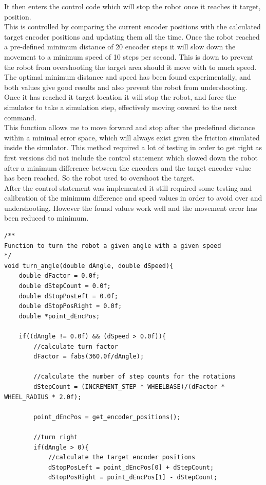 \documentclass[10pt,a4paper]{article}
\begin{document}
\begin{flushleft}
It then enters the control code which will stop the robot once it reaches it target, position. \\
This is controlled by comparing the current encoder positions with the calculated target encoder positions and updating them all the time. 
Once the robot reached a pre-defined minimum distance of 20 encoder steps it will slow down the movement to a minimum speed of 10 steps per second. This is down to prevent the robot from overshooting the target area should it move with to much speed. The optimal minimum distance and speed has been found experimentally, and both values give good results and also prevent the robot from undershooting.
Once it has reached it target location it will stop the robot, and force the simulator to take a simulation step, effectively moving onward to the next command.\\[3ex]

This function allows me to move forward and stop after the predefined distance within a minimal error space, which will always exist given the friction simulated inside the simulator. This method required a lot of testing in order to get right as first versions did not include the control statement which slowed down the robot after a minimum difference between the encoders and the target encoder value has been reached. So the robot used to overshoot the target. \\
After the control statement was implemented it still required some testing and calibration of the minimum difference and speed values in order to avoid over and undershooting. However the found values work well and the movement error has been reduced to minimum.\\

\begin{lstlisting}
/**
Function to turn the robot a given angle with a given speed
*/
void turn_angle(double dAngle, double dSpeed){
	double dFactor = 0.0f;
	double dStepCount = 0.0f;
	double dStopPosLeft = 0.0f;
	double dStopPosRight = 0.0f;
	double *point_dEncPos;
	
	if((dAngle != 0.0f) && (dSpeed > 0.0f)){
		//calculate turn factor
		dFactor = fabs(360.0f/dAngle);
		
		//calculate the number of step counts for the rotations
		dStepCount = (INCREMENT_STEP * WHEELBASE)/(dFactor * WHEEL_RADIUS * 2.0f);
		
		point_dEncPos = get_encoder_positions();
		
		//turn right
		if(dAngle > 0){
			//calculate the target encoder positions
			dStopPosLeft = point_dEncPos[0] + dStepCount;
			dStopPosRight = point_dEncPos[1] - dStepCount;
			

\end{lstlisting}
\end{flushleft}
\end{document}
